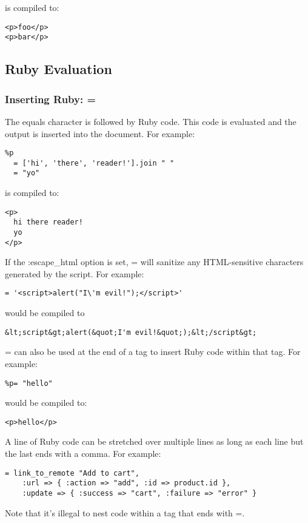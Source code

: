 \documentclass[10pt]{article}
\begin{document}
 is compiled to:
\begin{verbatim}
<p>foo</p>
<p>bar</p>
\end{verbatim}
\subsection*{Ruby Evaluation}
\subsubsection*{Inserting Ruby: =}


 The equals character is followed by Ruby code. This code is evaluated and the output is inserted into the document. For example:
\begin{verbatim}
%p
  = ['hi', 'there', 'reader!'].join " "
  = "yo"
\end{verbatim}


 is compiled to:
\begin{verbatim}
<p>
  hi there reader!
  yo
</p>
\end{verbatim}


 If the :escape\_html option is set, = will sanitize any HTML-sensitive characters generated by the script. For example:
\begin{verbatim}
= '<script>alert("I\'m evil!");</script>'
\end{verbatim}


 would be compiled to
\begin{verbatim}
&lt;script&gt;alert(&quot;I'm evil!&quot;);&lt;/script&gt;
\end{verbatim}


 = can also be used at the end of a tag to insert Ruby code within that tag. For example:
\begin{verbatim}
%p= "hello"
\end{verbatim}


 would be compiled to:
\begin{verbatim}
<p>hello</p>
\end{verbatim}


 A line of Ruby code can be stretched over multiple lines as long as each line but the last ends with a comma. For example:
\begin{verbatim}
= link_to_remote "Add to cart",
    :url => { :action => "add", :id => product.id },
    :update => { :success => "cart", :failure => "error" }
\end{verbatim}


 Note that it’s illegal to nest code within a tag that ends with =.
\end{document}
